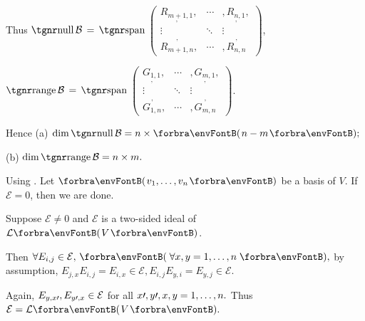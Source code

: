 Thus $\null\mathcal{B}\,=\,\Spn${\normalsize$\begin{pmatrix} \underset{,}{R_{m+1,1}}, & \cdots & ,\underset{,}{R_{n,1}},\\ \vdots & \ddots & \vdots\\ \overset{,}{R_{m+1,n}}, & \cdots & ,\overset{,}{R_{n,n}}\end{pmatrix}$},\par\qquad\quad\!$\range\mathcal{B}\,=\,\Spn${\normalsize$\begin{pmatrix} \underset{,}{G_{1,1}}, & \cdots & ,\underset{,}{G_{m,1}},\\ \vdots & \ddots & \vdots\\ \overset{,}{G_{1,n}}, & \cdots & ,\overset{,}{G_{m,n}}\end{pmatrix}$}.\vspace{-37pt}\par\hspace{230pt}
Hence (a) $\dim\null\mathcal{B}=n\times\Par{n-m};$\par\hspace{266pt} (b) $\dim\range\mathcal{B}=n\times m.$\PfEnd
\SepLine

Using \NOTEFOR\;[3.60]. Let $\Par{v_1,\dots,v_n}$ be a basis of $V$. If $\mathcal{E}=0$, then we are done.\par\quad Suppose $\mathcal{E}\neq 0$ and $\mathcal{E}$ is a two-sided ideal of $\Lm{V}$.\vspace{3pt}\par\quad
Then {\Large$\forall E_{i,j}\in\mathcal{E},\,\Par{\,\forall x,y=1,\dots,n\,},$} by assumption, {\Large\vspace{3pt}$E_{j,x}E_{i,j}=E_{i,x}\in\mathcal{E},E_{i,j}E_{y,i}=E_{y,j}\in\mathcal{E}.$}\par\quad
Again, {\Large$E_{y,x\prime},E_{y\prime,x}\in\mathcal{E}$} for all $x\prime,y\prime,x,y=1,\dots,n.$ Thus $\mathcal{E}=\Lm{V}.$\PfEnd
\SepLine

